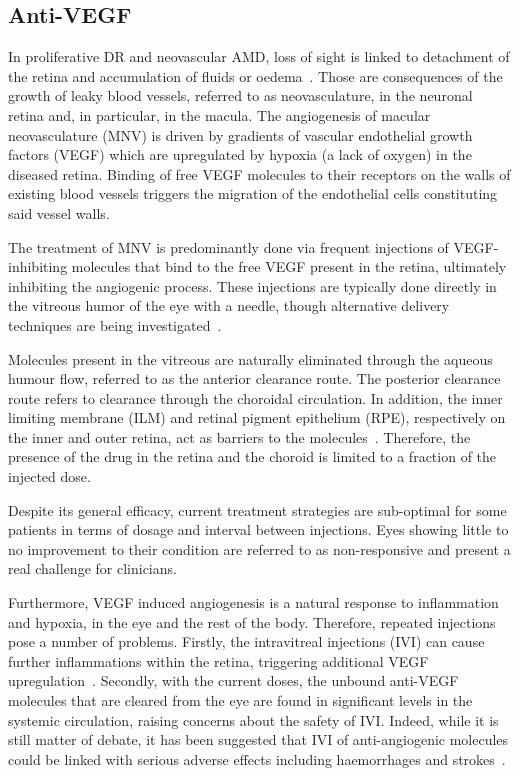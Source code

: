 \documentclass[12pt,a4paper]{journal}
\begin{document}
\subsection*{Anti-VEGF}

In proliferative DR and neovascular AMD, loss of sight is linked to detachment of the retina and accumulation of fluids or oedema~\cite{Roberts_2020, Waldstein_2016}.
Those are consequences of the growth of leaky blood vessels, referred to as neovasculature, in the neuronal retina and, in particular, in the macula.
The angiogenesis of macular neovasculature (MNV) is driven by gradients of vascular endothelial growth factors (VEGF) which are upregulated by hypoxia (a lack of oxygen) in the diseased retina.
Binding of free VEGF molecules to their receptors on the walls of existing blood vessels triggers the migration of the endothelial cells constituting said vessel walls.

The treatment of MNV is predominantly done via frequent injections of VEGF-inhibiting molecules that bind to the free VEGF present in the retina, ultimately inhibiting the angiogenic process.
These injections are typically done directly in the vitreous humor of the eye with a needle, though alternative delivery techniques are being investigated~\cite{Kim_2021}.

Molecules present in the vitreous are naturally eliminated through the aqueous humour flow, referred to as the anterior clearance route.
The posterior clearance route refers to clearance through the choroidal circulation.
In addition, the inner limiting membrane (ILM) and retinal pigment epithelium (RPE), respectively on the inner and outer retina, act as barriers to the molecules~\cite{Park_2015}.
Therefore, the presence of the drug in the retina and the choroid is limited to a fraction of the injected dose. 

Despite its general efficacy, current treatment strategies are sub-optimal for some patients in terms of dosage and interval between injections.
Eyes showing little to no improvement to their condition are referred to as non-responsive and present a real challenge for clinicians.

Furthermore, VEGF induced angiogenesis is a natural response to inflammation and hypoxia, in the eye and the rest of the body. 
Therefore, repeated injections pose a number of problems.
Firstly, the intravitreal injections (IVI) can cause further inflammations within the retina, triggering additional VEGF upregulation~\cite{Iyer_2022}.
Secondly, with the current doses, the unbound anti-VEGF molecules that are cleared from the eye are found in significant levels in the systemic circulation, raising concerns about the safety of IVI.
Indeed, while it is still matter of debate, it has been suggested that IVI of anti-angiogenic molecules could be linked with serious adverse effects including haemorrhages and strokes~\cite{Avery_2016, Kaiser_2019, Maloney_2021}.
\end{document}
